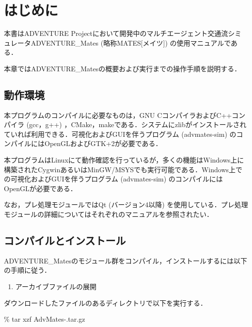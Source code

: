 
\section{はじめに}
\label{sect:introduction}

本書はADVENTURE Project\cite{adv:HP}において開発中のマルチエージェント交通流シミュレータADVENTURE\_Mates (略称MATES[メイツ]) の使用マニュアルである．

本章ではADVENTURE\_Matesの概要および実行までの操作手順を説明する．

\subsection{動作環境}
\label{subsect:environment}

本プログラムのコンパイルに必要なものは，GNU CコンパイラおよびC++コンパイラ (gcc，g++) ，CMake，makeである．システムにzlibがインストールされていれば利用できる．可視化およびGUIを伴うプログラム (advmates-sim) のコンパイルにはOpenGLおよびGTK+2が必要である．

本プログラムはLinuxにて動作確認を行っているが，多くの機能はWindows上に構築されたCygwinあるいはMinGW/MSYSでも実行可能である．Windows上での可視化およびGUIを伴うプログラム (advmates-sim) のコンパイルにはOpenGLが必要である．

なお，プレ処理モジュールではQt (バージョン4以降) を使用している．プレ処理モジュールの詳細についてはそれぞれのマニュアルを参照されたい．

\subsection{コンパイルとインストール}
\label{subsect:compiling}

ADVENTURE\_Matesのモジュール群をコンパイル，インストールするには以下の手順に従う．

\begin{enumerate}
  \renewcommand{\labelenumi}{(\arabic{enumi})}

\item アーカイブファイルの展開
  \setcounter{buildnum}{\value{enumi}}
\end{enumerate}

ダウンロードしたファイルのあるディレクトリで以下を実行する．

\begin{screen}
  \% tar xzf AdvMates-{\advmatesver}.tar.gz
\end{screen}


